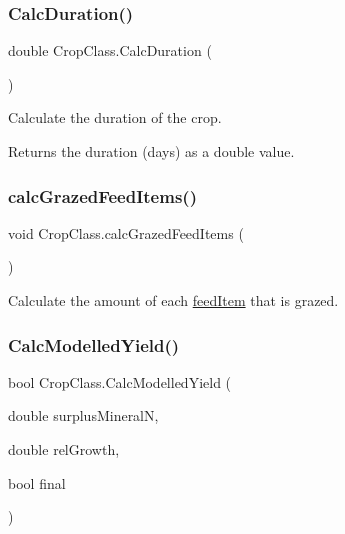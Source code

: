 \subsubsection{\texorpdfstring{CalcDuration()}{CalcDuration()}}
{\footnotesize\ttfamily double Crop\+Class.\+Calc\+Duration (\begin{DoxyParamCaption}{ }\end{DoxyParamCaption})\hspace{0.3cm}{\ttfamily [inline]}}



Calculate the duration of the crop. 

\begin{DoxyReturn}{Returns}
the duration (days) as a double value. 
\end{DoxyReturn}
\mbox{\label{class_crop_class_a5f689b2dad39470858a9c30c179f9f86}} 
\subsubsection{\texorpdfstring{calcGrazedFeedItems()}{calcGrazedFeedItems()}}
{\footnotesize\ttfamily void Crop\+Class.\+calc\+Grazed\+Feed\+Items (\begin{DoxyParamCaption}{ }\end{DoxyParamCaption})\hspace{0.3cm}{\ttfamily [inline]}}



Calculate the amount of each \mbox{\hyperlink{classfeed_item}{feed\+Item}} that is grazed. 

\mbox{\label{class_crop_class_a583fd6d85ee5f428aebe026f8c5ae3bf}} 
\subsubsection{\texorpdfstring{CalcModelledYield()}{CalcModelledYield()}}
{\footnotesize\ttfamily bool Crop\+Class.\+Calc\+Modelled\+Yield (\begin{DoxyParamCaption}\item[{double}]{surplus\+MineralN,  }\item[{double}]{rel\+Growth,  }\item[{bool}]{final }\end{DoxyParamCaption})\hspace{0.3cm}{\ttfamily [inline]}}



